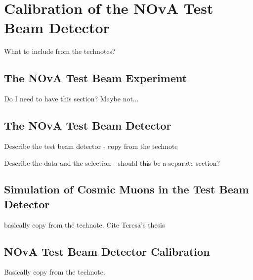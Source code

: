 \chapter{Calibration of the NOvA Test Beam Detector}\label{sec:TestBeamCalibration}

What to include from the technotes?

\section{The NOvA Test Beam Experiment}

Do I need to have this section? Maybe not...

\section{The NOvA Test Beam Detector}\label{sec:TBDetector}
Describe the test beam detector - copy from the technote

Describe the data and the selection - should this be a separate section?

\iffalse
\begin{figure}[hbtp]
\centering
\texttt{[image: Plots/RemoveTBSpills.pdf]}
\caption{Test Beam beam spill events removed from the calibration samples. Test Beam beam spill is 4.2 seconds long and we remove events (in blue) within a 5 seconds window from the start of the beam spill. The remaining events (green) should mostly consist of cosmic particles. This example and the numbers of entries are for the full period 4 Test Beam sample.}
\label{figRemoveBeamSpill}
\end{figure}
\fi

\section{Simulation of Cosmic Muons in the Test Beam Detector}
basically copy from the technote. Cite Teresa's thesis

\section{NOvA Test Beam Detector Calibration}
Basically copy from the technote.